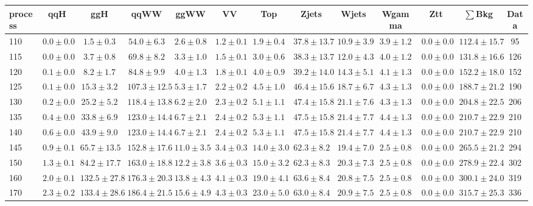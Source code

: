 \begin{table}
{%
 \tiny
 \begin{center}
 \begin{tabular}{l | c c | c c c c c c c c  | c c}
 \hline
 process & qqH & ggH & qqWW & ggWW & VV & Top & Zjets & Wjets & Wgamma & Ztt & $\sum$Bkg & Data \\
 \hline
110 & $0.0\pm0.0$ & $1.5\pm0.3$ & $54.0\pm6.3$ & $2.6\pm0.8$ & $1.2\pm0.1$ & $1.9\pm0.4$ & $37.8\pm13.7$ & $10.9\pm3.9$ & $3.9\pm1.2$ & $0.0\pm0.0$ & $112.4\pm15.7$ & 95 \\
115 & $0.0\pm0.0$ & $3.7\pm0.8$ & $69.8\pm8.2$ & $3.3\pm1.0$ & $1.5\pm0.1$ & $3.0\pm0.6$ & $38.3\pm13.7$ & $12.0\pm4.3$ & $4.0\pm1.2$ & $0.0\pm0.0$ & $131.8\pm16.6$ & 126 \\
120 & $0.1\pm0.0$ & $8.2\pm1.7$ & $84.8\pm9.9$ & $4.0\pm1.3$ & $1.8\pm0.1$ & $4.0\pm0.9$ & $39.2\pm14.0$ & $14.3\pm5.1$ & $4.1\pm1.3$ & $0.0\pm0.0$ & $152.2\pm18.0$ & 152 \\
125 & $0.1\pm0.0$ & $15.3\pm3.2$ & $107.3\pm12.5$ & $5.3\pm1.7$ & $2.2\pm0.2$ & $4.5\pm1.0$ & $46.4\pm15.6$ & $18.7\pm6.7$ & $4.3\pm1.3$ & $0.0\pm0.0$ & $188.7\pm21.2$ & 190 \\
130 & $0.2\pm0.0$ & $25.2\pm5.2$ & $118.4\pm13.8$ & $6.2\pm2.0$ & $2.3\pm0.2$ & $5.1\pm1.1$ & $47.4\pm15.8$ & $21.1\pm7.6$ & $4.3\pm1.3$ & $0.0\pm0.0$ & $204.8\pm22.5$ & 206 \\
135 & $0.4\pm0.0$ & $33.8\pm6.9$ & $123.0\pm14.4$ & $6.7\pm2.1$ & $2.4\pm0.2$ & $5.3\pm1.1$ & $47.5\pm15.8$ & $21.4\pm7.7$ & $4.4\pm1.3$ & $0.0\pm0.0$ & $210.7\pm22.9$ & 210 \\
140 & $0.6\pm0.0$ & $43.9\pm9.0$ & $123.0\pm14.4$ & $6.7\pm2.1$ & $2.4\pm0.2$ & $5.3\pm1.1$ & $47.5\pm15.8$ & $21.4\pm7.7$ & $4.4\pm1.3$ & $0.0\pm0.0$ & $210.7\pm22.9$ & 210 \\
145 & $0.9\pm0.1$ & $65.7\pm13.5$ & $152.8\pm17.6$ & $11.0\pm3.5$ & $3.4\pm0.3$ & $14.0\pm3.0$ & $62.3\pm8.2$ & $19.4\pm7.0$ & $2.5\pm0.8$ & $0.0\pm0.0$ & $265.5\pm21.2$ & 294 \\
150 & $1.3\pm0.1$ & $84.2\pm17.7$ & $163.0\pm18.8$ & $12.2\pm3.8$ & $3.6\pm0.3$ & $15.0\pm3.2$ & $62.3\pm8.3$ & $20.3\pm7.3$ & $2.5\pm0.8$ & $0.0\pm0.0$ & $278.9\pm22.4$ & 302 \\
160 & $2.0\pm0.1$ & $132.5\pm27.8$ & $176.3\pm20.3$ & $13.8\pm4.3$ & $4.1\pm0.3$ & $19.0\pm4.1$ & $63.6\pm8.4$ & $20.8\pm7.5$ & $2.5\pm0.8$ & $0.0\pm0.0$ & $300.1\pm24.0$ & 319 \\
170 & $2.3\pm0.2$ & $133.4\pm28.6$ & $186.4\pm21.5$ & $15.6\pm4.9$ & $4.3\pm0.3$ & $23.0\pm5.0$ & $63.0\pm8.4$ & $20.9\pm7.5$ & $2.5\pm0.8$ & $0.0\pm0.0$ & $315.7\pm25.3$ & 336 \\

\end{tabular}
\end{center}}
\end{table}
